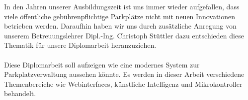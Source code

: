 In den Jahren unserer Ausbildungszeit ist uns immer wieder aufgefallen, dass viele öffentliche gebührenpflichtige Parkplätze nicht mit neuen Innovationen betrieben werden. 
Daraufhin haben wir uns durch zusätzliche Anregung von unserem Betreuungslehrer Dipl.-Ing. Christoph Stüttler dazu entschieden diese Thematik für unsere Diplomarbeit heranzuziehen.
\\ \\
Diese Diplomarbeit soll aufzeigen wie eine modernes System zur Parkplatzverwaltung aussehen könnte. Es werden in dieser Arbeit verschiedene Themenbereiche wie Webinterfaces, künstliche Intelligenz und Mikrokontroller behandelt.